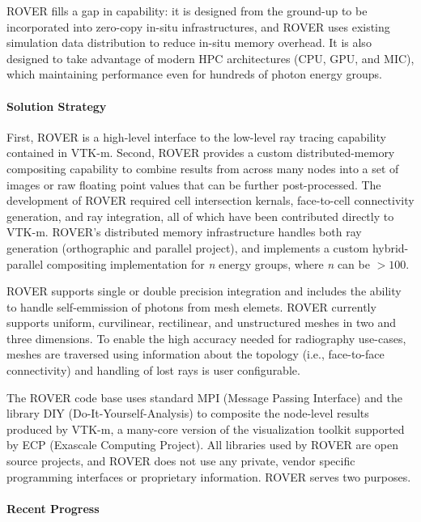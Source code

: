 ROVER fills a gap in capability: it is designed from the ground-up to be
incorporated into zero-copy in-situ infrastructures, and ROVER uses existing
simulation data distribution to reduce in-situ memory overhead.  It is also
designed to take advantage of modern HPC architectures (CPU, GPU, and MIC),
which maintaining performance even for hundreds of photon energy groups.

\paragraph{Solution Strategy}

First, ROVER is a high-level interface to the low-level ray tracing capability
contained in VTK-m. Second, ROVER provides a custom distributed-memory
compositing capability to combine results from across many nodes into a set of
images or raw floating point values that can be further post-processed. The
development of ROVER required cell intersection kernals, face-to-cell
connectivity generation, and ray integration, all of which have been
contributed directly to VTK-m.  ROVER's distributed memory 
infrastructure handles both ray generation (orthographic and parallel project),
and implements a custom hybrid-parallel compositing implementation for
\textit{n} energy groups, where \textit{n} can be $>100$.

ROVER supports single or double precision integration and includes the ability
to handle self-emmission of photons from mesh elemets. ROVER currently supports
uniform, curvilinear, rectilinear, and unstructured meshes in two and three
dimensions. To enable the high accuracy needed for radiography use-cases,
meshes are traversed using information about the topology (i.e., face-to-face
connectivity) and handling of lost rays is user configurable.

The ROVER code base uses standard MPI (Message Passing Interface) and the
library DIY (Do-It-Yourself-Analysis) to composite the node-level results
produced by VTK-m, a many-core version of the visualization toolkit supported
by ECP (Exascale Computing Project). All libraries used by ROVER are open
source projects, and ROVER does not use any private, vendor specific
programming interfaces or proprietary information. ROVER serves two purposes.

\paragraph{Recent Progress}

